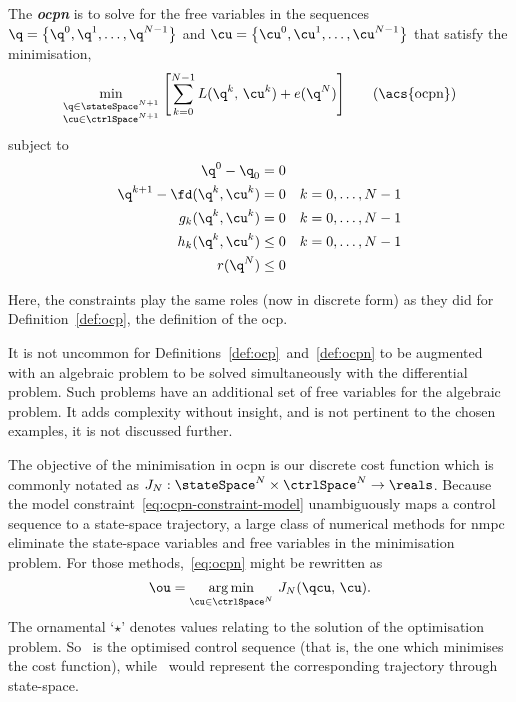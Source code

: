 \begin{definition}\label{def:ocpn} The \emph{\textbf{\acf{ocpn}}} is to solve
for the free variables in the  sequences
%
$\q =\bigl\{\q^0,\q^1,\ldots,\q^{N-1}\bigr\}$
%
and
%
$\cu =\bigl\{\cu^0,\cu^1,\ldots,\cu^{N-1}\bigr\}$
%
that satisfy the minimisation,
%
\begin{equation}
  \min_{\substack{\q\in\stateSpace^{N+1}\\ \cu\in\ctrlSpace^{N+1}}}\; \Biggl[ \sum_{k=0}^{N-1} L(\q^k,\, \cu^k) + e(\q^N) \Biggr]\tag{\acs{ocpn}}\label{eq:ocpn}
\end{equation}
%
subject to
%
\begin{align}
  \q^0 - \q_0 &= 0\\
  \q^{k+1} - \fd(\q^k, \cu^k) &= 0\quad k = 0,\ldots,N-1 \label{eq:ocpn-constraint-model}\\
  g_k(\q^k, \cu^k) &= 0\quad k = 0,\ldots,N-1\\
  h_k(\q^k, \cu^k) &\leq 0\quad k = 0,\ldots,N-1\\
  r(\q^N) &\leq 0
\end{align}
%
\end{definition}
Here, the constraints play the same roles (now in discrete form) as they did for
Definition~\ref{def:ocp}, the definition of the \ac{ocp}.

It is not uncommon for Definitions~\ref{def:ocp}~and~\ref{def:ocpn} to be
augmented with an algebraic problem to be solved simultaneously with the
differential problem. Such problems have an additional set of free variables for
the algebraic problem. It adds complexity without insight, and is not pertinent
to the chosen examples, it is not discussed further.

The objective of the minimisation in \ac{ocpn} is our discrete cost
function which is commonly notated as
$J_N:\stateSpace^N\times\ctrlSpace^N\rightarrow\reals$. Because the model
constraint~\eqref{eq:ocpn-constraint-model} unambiguously maps a control
sequence to a state-space trajectory, a large class of numerical methods for
\ac{nmpc} eliminate the state-space variables and free variables in the
minimisation problem. For those methods,~\eqref{eq:ocpn} might be rewritten as
\begin{equation} \label{eq:u_optimal} \ou = \argmin_{\cu\in\ctrlSpace^N}\,
J_N(\qcu,\, \cu). \end{equation} The ornamental `$\star$' denotes values
relating to the solution of the optimisation problem. So \ou\ is the optimised
control sequence (that is, the one which minimises the cost function), while
\oq\ would represent the corresponding trajectory through state-space.

